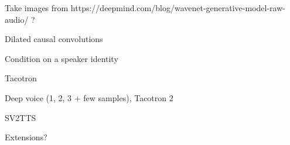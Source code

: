 \documentclass[a4paper, oneside]{article}
\begin{document}
Take images from https://deepmind.com/blog/wavenet-generative-model-raw-audio/ ?

Dilated causal convolutions

Condition on a speaker identity

Tacotron

Deep voice (1, 2, 3 + few samples), Tacotron 2

SV2TTS

Extensions?
\color{black}



\color{red}
\color{black}

\clearpage

 


























\end{document}
